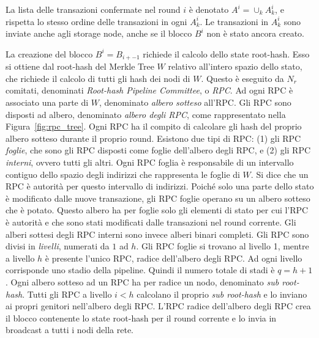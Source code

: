 La lista delle transazioni confermate nel round $i$ è denotato $A^i = \cup_k A_k^i$, e rispetta lo stesso ordine delle transazioni in ogni $A_k^i$. Le transazioni in $A_k^i$ sono inviate anche agli storage node, anche se il blocco $B^i$ non è stato ancora creato.

La creazione del blocco $B^i = B_{i+-1}$ richiede il calcolo dello state root-hash. Esso si ottiene dal root-hash del Merkle Tree $W$ relativo all'intero spazio dello stato, che richiede il calcolo di tutti gli hash dei nodi di $W$.
Questo è eseguito da $N_r$ comitati, denominati \emph{Root-hash Pipeline Committee}, o \emph{RPC}. Ad ogni RPC è associato una parte di $W$, denominato \emph{albero sotteso} all'RPC. Gli RPC sono disposti ad albero, denominato \emph{albero degli RPC}, come rappresentato nella Figura~\ref{fig:rpc_tree}. Ogni RPC ha il compito di calcolare gli hash del proprio albero sotteso durante il proprio round. Esistono due tipi di RPC: (1) gli RPC \emph{foglie}, che sono gli RPC disposti come foglie dell'albero degli RPC, e (2) gli RPC \emph{interni}, ovvero tutti gli altri. Ogni RPC foglia è responsabile di un intervallo contiguo dello spazio degli indirizzi che rappresenta le foglie di $W$. Si dice che un RPC è autorità per questo intervallo di indirizzi. Poiché solo una parte dello stato è modificato dalle nuove transazione, gli RPC foglie operano su un albero sotteso che è potato. Questo albero ha per foglie solo gli elementi di stato per cui l'RPC è autorità e che sono stati modificati dalle transazioni nel round corrente. Gli alberi sottesi degli RPC interni sono invece alberi binari completi. Gli RPC sono divisi in \emph{livelli}, numerati da $1$ ad $h$. Gli RPC foglie si trovano al livello 1, mentre a livello $h$ è presente l'unico RPC, radice dell'albero degli RPC. Ad ogni livello corrisponde uno stadio della pipeline. Quindi il numero totale di stadi è $q = h+1$. Ogni albero sotteso ad un RPC ha per radice un nodo, denominato \emph{sub root-hash}. Tutti gli RPC a livello $i < h$ calcolano il proprio \emph{sub root-hash} e lo inviano ai propri genitori nell'albero degli RPC. L'RPC radice dell'albero degli RPC crea il blocco contenente lo state root-hash per il round corrente e lo invia in broadcast a tutti i nodi della rete.

